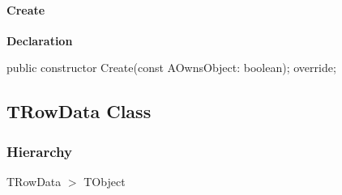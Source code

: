 \documentclass{report}
\newif\ifpdf
\begin{document}
\paragraph*{Create}\hspace*{\fill}

\label{PasDoc_Gen.TListData-Create}
\begin{list}{}{
\setlength{\itemindent}{0cm}
\setlength{\listparindent}{0cm}
\setlength{\leftmargin}{\evensidemargin}
\addtolength{\leftmargin}{\tmplength}
\settowidth{\labelsep}{X}
\addtolength{\leftmargin}{\labelsep}
\setlength{\labelwidth}{\tmplength}
}
\item[\textbf{Declaration}\hfill]
\ifpdf
\begin{flushleft}
\fi
\begin{ttfamily}
public constructor Create(const AOwnsObject: boolean); override;\end{ttfamily}

\ifpdf
\end{flushleft}
\fi

\end{list}
\ifpdf
\subsection*{\large{\textbf{TRowData Class}}\normalsize\hspace{1ex}\hrulefill}
\else
\subsection*{TRowData Class}
\fi
\label{PasDoc_Gen.TRowData}
\subsubsection*{\large{\textbf{Hierarchy}}\normalsize\hspace{1ex}\hfill}
TRowData {$>$} TObject
\end{document}
